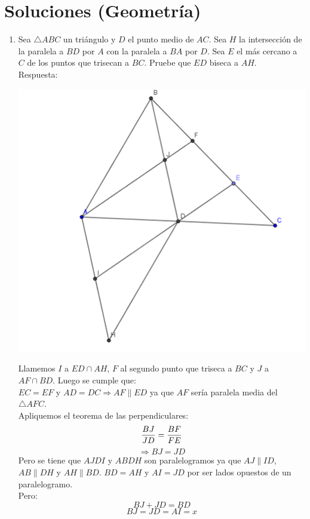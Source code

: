 \documentclass{book}
\begin{document}
    \section{Soluciones (Geometría)}
    \begin{enumerate}
        \item Sea $\triangle ABC$ un triángulo y $D$ el punto medio de $AC$. Sea $H$ la intersección de la paralela a $BD$ por $A$ con la paralela a $BA$ por $D$. Sea $E$ el más cercano a $C$ de los puntos que trisecan a $BC$. Pruebe que $ED$ biseca a $AH$.\\
        Respuesta:
        \begin{center}
            \includegraphics[scale=1]{imagenes/Geometria/1.png}
        \end{center}
        Llamemos $I$ a $ED\cap AH$, $F$ al segundo punto que triseca a $BC$ y $J$ a $AF\cap BD$. Luego se cumple que:\\
        $EC=EF$ y $AD=DC\Rightarrow AF\parallel ED$ ya que $AF$ sería paralela media del $\triangle AFC$.\\
        Apliquemos el teorema de las perpendiculares:
        $${BJ\over JD}={BF\over FE}$$
        $$\Rightarrow BJ=JD$$
        Pero se tiene que $AJDI$ y $ABDH$ son paralelogramos ya que $AJ\parallel ID$, $AB\parallel DH$ y $AH\parallel BD$.
        $BD=AH$ y $AI=JD$ por ser lados opuestos de un paralelogramo.\\
        Pero:
        $$BJ+JD=BD$$
        $$BJ=JD=AI=x$$

\end{enumerate}
\end{document}
